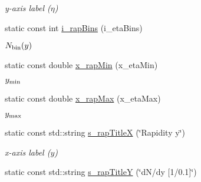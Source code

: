 \begin{CompactItemize}
\begin{CompactList}\small\item\em y-axis label ($\eta$) \item\end{CompactList}\item 
\hypertarget{namespaceHistGroupCfg_c76a22d3069a0f91fb7ab144e782bdfa}{
static const int \hyperlink{namespaceHistGroupCfg_c76a22d3069a0f91fb7ab144e782bdfa}{i\_\-rap\-Bins} (i\_\-eta\-Bins)}
\label{namespaceHistGroupCfg_c76a22d3069a0f91fb7ab144e782bdfa}

\begin{CompactList}\small\item\em $N_{\rm bin}(y)$ \item\end{CompactList}\item 
\hypertarget{namespaceHistGroupCfg_eadadb8f11759a5ef7c0c2f325badd11}{
static const double \hyperlink{namespaceHistGroupCfg_eadadb8f11759a5ef7c0c2f325badd11}{x\_\-rap\-Min} (x\_\-eta\-Min)}
\label{namespaceHistGroupCfg_eadadb8f11759a5ef7c0c2f325badd11}

\begin{CompactList}\small\item\em $y_{\rm min}$ \item\end{CompactList}\item 
\hypertarget{namespaceHistGroupCfg_177a249b5a6f971ea82cd7ecdb7967c5}{
static const double \hyperlink{namespaceHistGroupCfg_177a249b5a6f971ea82cd7ecdb7967c5}{x\_\-rap\-Max} (x\_\-eta\-Max)}
\label{namespaceHistGroupCfg_177a249b5a6f971ea82cd7ecdb7967c5}

\begin{CompactList}\small\item\em $y_{\rm max}$ \item\end{CompactList}\item 
\hypertarget{namespaceHistGroupCfg_7c3f285252b067d469a75906f574e1d7}{
static const std::string \hyperlink{namespaceHistGroupCfg_7c3f285252b067d469a75906f574e1d7}{s\_\-rap\-Title\-X} (\char`\"{}Rapidity y\char`\"{})}
\label{namespaceHistGroupCfg_7c3f285252b067d469a75906f574e1d7}

\begin{CompactList}\small\item\em x-axis label ($y$) \item\end{CompactList}\item 
\hypertarget{namespaceHistGroupCfg_8eb3c4df269632d1328e40c63cdf8c66}{
static const std::string \hyperlink{namespaceHistGroupCfg_8eb3c4df269632d1328e40c63cdf8c66}{s\_\-rap\-Title\-Y} (\char`\"{}d\-N/dy \mbox{[}1/0.1\mbox{]}\char`\"{})}
\label{namespaceHistGroupCfg_8eb3c4df269632d1328e40c63cdf8c66}


\end{CompactItemize}
